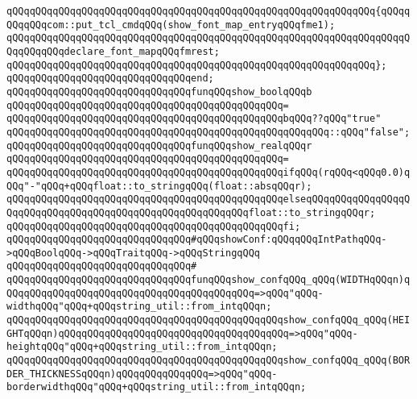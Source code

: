 \verb|qQQqqQQqqQQqqQQqqQQqqQQqqQQqqQQqqQQqqQQqqQQqqQQqqQQqqQQqqQQqqQQq{qQQqqQQqqQQqcom::put_tcl_cmdqQQq(show_font_map_entryqQQqfme1);|\newline
\verb|qQQqqQQqqQQqqQQqqQQqqQQqqQQqqQQqqQQqqQQqqQQqqQQqqQQqqQQqqQQqqQQqqQQqqQQqqQQqqQQqdeclare_font_mapqQQqfmrest;|\newline
\verb|qQQqqQQqqQQqqQQqqQQqqQQqqQQqqQQqqQQqqQQqqQQqqQQqqQQqqQQqqQQqqQQq};|\newline
\verb|qQQqqQQqqQQqqQQqqQQqqQQqqQQqqQQqend;|\newline
\newline
\verb|qQQqqQQqqQQqqQQqqQQqqQQqqQQqqQQqfunqQQqshow_boolqQQqb|\newline
\verb|qQQqqQQqqQQqqQQqqQQqqQQqqQQqqQQqqQQqqQQqqQQqqQQq=|\newline
\verb|qQQqqQQqqQQqqQQqqQQqqQQqqQQqqQQqqQQqqQQqqQQqqQQqbqQQq??qQQq"true"|\newline
\verb|qQQqqQQqqQQqqQQqqQQqqQQqqQQqqQQqqQQqqQQqqQQqqQQqqQQqqQQq::qQQq"false";|\newline
\newline
\verb|qQQqqQQqqQQqqQQqqQQqqQQqqQQqqQQqfunqQQqshow_realqQQqr|\newline
\verb|qQQqqQQqqQQqqQQqqQQqqQQqqQQqqQQqqQQqqQQqqQQqqQQq=|\newline
\verb|qQQqqQQqqQQqqQQqqQQqqQQqqQQqqQQqqQQqqQQqqQQqqQQqifqQQq(rqQQq<qQQq0.0)qQQq"-"qQQq+qQQqfloat::to_stringqQQq(float::absqQQqr);|\newline
\verb|qQQqqQQqqQQqqQQqqQQqqQQqqQQqqQQqqQQqqQQqqQQqqQQqelseqQQqqQQqqQQqqQQqqQQqqQQqqQQqqQQqqQQqqQQqqQQqqQQqqQQqqQQqqQQqfloat::to_stringqQQqr;|\newline
\verb|qQQqqQQqqQQqqQQqqQQqqQQqqQQqqQQqqQQqqQQqqQQqqQQqfi;|\newline
\newline
\verb|qQQqqQQqqQQqqQQqqQQqqQQqqQQqqQQq#qQQqshowConf:qQQqqQQqIntPathqQQq->qQQqBoolqQQq->qQQqTraitqQQq->qQQqStringqQQq|\newline
\verb|qQQqqQQqqQQqqQQqqQQqqQQqqQQqqQQq#|\newline
\verb|qQQqqQQqqQQqqQQqqQQqqQQqqQQqqQQqfunqQQqshow_confqQQq_qQQq(WIDTHqQQqn)qQQqqQQqqQQqqQQqqQQqqQQqqQQqqQQqqQQqqQQqqQQq=>qQQq"qQQq-widthqQQq"qQQq+qQQqstring_util::from_intqQQqn;|\newline
\verb|qQQqqQQqqQQqqQQqqQQqqQQqqQQqqQQqqQQqqQQqqQQqqQQqshow_confqQQq_qQQq(HEIGHTqQQqn)qQQqqQQqqQQqqQQqqQQqqQQqqQQqqQQqqQQqqQQq=>qQQq"qQQq-heightqQQq"qQQq+qQQqstring_util::from_intqQQqn;|\newline
\verb|qQQqqQQqqQQqqQQqqQQqqQQqqQQqqQQqqQQqqQQqqQQqqQQqshow_confqQQq_qQQq(BORDER_THICKNESSqQQqn)qQQqqQQqqQQqqQQq=>qQQq"qQQq-borderwidthqQQq"qQQq+qQQqstring_util::from_intqQQqn;|\newline
